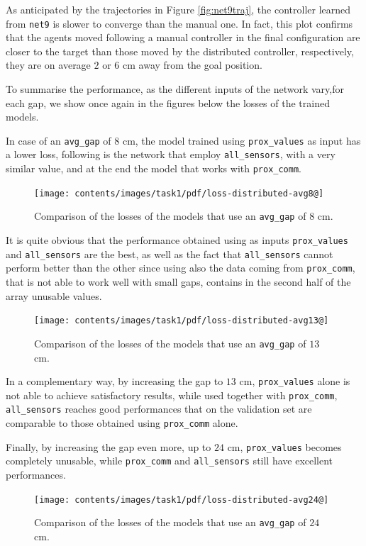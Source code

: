 As anticipated by the trajectories in Figure \ref{fig:net9traj}, the controller 
learned from \texttt{net9} is slower to converge than the manual one. In fact, 
this plot confirms that the agents moved following a manual controller in the final 
configuration are closer to the target than those moved by the distributed 
controller, respectively, they are on average $2$ or $6$ \gls{cm} away from the 
goal position.

To summarise the performance, as the different inputs of the network vary,for 
each gap, we show once again in the figures below the losses of the trained 
models.

In case of an \texttt{avg\_gap} of $8$ \gls{cm}, the model trained using 
\texttt{prox\_values} as input has a lower loss, following is the network that 
employ \texttt{all\_sensors}, with a very similar value, and at the end the model 
that works with \texttt{prox\_comm}.
\begin{figure}[!htb]
	\centering
	\texttt{[image: contents/images/task1/pdf/loss-distributed-avg8@]}%
	\caption{Comparison of the losses of the models that use an \texttt{avg\_gap} 
		of $8$ \gls{cm}.}
	\label{fig:distloss8}
\end{figure}
It is quite obvious that the performance obtained using as inputs 
\texttt{prox\_values} and \texttt{all\_sensors} are the best, as well as the fact that 
\texttt{all\_sensors} cannot perform better than the other since using also the 
data coming from \texttt{prox\_comm}, that is not able to work well with small 
gaps, contains in the second half of the array unusable values.

\begin{figure}[!htb]
	\centering
	\texttt{[image: contents/images/task1/pdf/loss-distributed-avg13@]}%
	\caption{Comparison of the losses of the models that use an \texttt{avg\_gap} 
		of $13$ \gls{cm}.}
	\label{fig:distloss13}
\end{figure}
In a complementary way, by increasing the gap to $13$ \gls{cm},  
\texttt{prox\_values} alone is not able to achieve satisfactory results, while used 
together with \texttt{prox\_comm}, \texttt{all\_sensors} reaches good 
performances that on the validation set are comparable to those obtained using 
\texttt{prox\_comm} alone.

Finally, by increasing the gap even more, up to $24$ \gls{cm}, 
\texttt{prox\_values} becomes completely unusable, while \texttt{prox\_comm} 
and \texttt{all\_sensors} still have excellent performances.
\begin{figure}[!htb]
	\centering
	\texttt{[image: contents/images/task1/pdf/loss-distributed-avg24@]}%
	\caption{Comparison of the losses of the models that use an \texttt{avg\_gap} 
	of $24$ \gls{cm}.}
	\label{fig:distloss24}
\end{figure}

